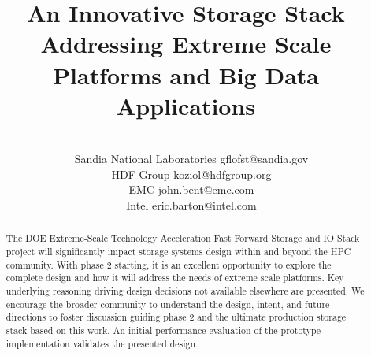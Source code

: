 \documentclass{sig-alt-gov2}
\begin{document}

\title{An Innovative Storage Stack Addressing Extreme Scale Platforms and Big Data Applications}

\author{
\\
\footnotemark[1]~~Sandia National Laboratories gflofst@sandia.gov\\
\footnotemark[3]~~HDF Group koziol@hdfgroup.org\\
\footnotemark[4]~~EMC john.bent@emc.com\\
\footnotemark[5]~~Intel eric.barton@intel.com
}
\maketitle

\begin{abstract}
The DOE Extreme-Scale Technology Acceleration Fast Forward Storage and IO Stack
project will significantly impact storage systems design within and beyond the
HPC community. With phase 2 starting, it is an excellent opportunity to explore
the complete design and how it will address the needs of extreme scale
platforms.
Key underlying reasoning driving design
decisions not available elsewhere are presented.  We encourage the broader
community to understand the design, intent, and future directions to foster
discussion guiding phase 2 and the ultimate production storage stack based on
this work.  An initial performance evaluation of the prototype implementation
validates the presented design.

\end{abstract}
\end{document}
